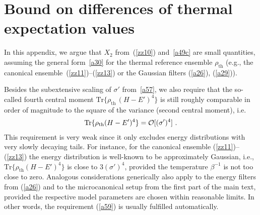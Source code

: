 \documentclass[twocolumn,aps,prb,floatfix,superscriptaddress]{revtex4-2}
\newcommand{\<}{\left\langle}	%
\renewcommand{\>}{\right\rangle}	%
\newcommand{\Pc}{\rho_{\mathrm{th}}}
\newcommand{\tr}{\mbox{Tr}}
\newcommand{\ord}{{\cal O}}
\newcommand{\rhoth}{\rho_{\mathrm{th}}}
\newcommand{\mref}[1]{\ref{#1}}
\begin{document}
\section{Bound on differences of thermal expectation values}
\label{app:C}

In this appendix,
we argue that $X_2$ from~(\mref{zz10}) and~\eqref{a49c} are small quantities,
assuming the general form~\eqref{a30} for the thermal reference ensemble $\rhoth$
(e.g., the canonical ensemble~(\mref{zz11})--(\mref{zz13}) or the Gaussian filters (\ref{a26}), (\ref{a29})).

Besides the subextensive scaling of $\sigma'$ from~\eqref{a57},
we also require
that the so-called fourth 
central moment $ \tr\{\Pc\, (H-E')^4\}$ is still roughly 
comparable in order of magnitude to the square of the
variance (second central moment), i.e.
\begin{eqnarray}
\tr\{\Pc (H-E')^4\} = \ord[ (\sigma')^4 ]
\ .
\label{a59}
\end{eqnarray}
This requirement is very weak since it only excludes
energy distributions with very slowly decaying tails.
For instance, for the canonical ensemble (\mref{zz11})--(\mref{zz13})
the energy distribution is well-known to be 
approximately Gaussian, 
i.e., $ \tr\{\Pc(H-E')^4\}$
is close to $3(\sigma')^4$, provided the
temperature $\beta^{-1}$ is not too close to zero.
Analogous considerations generically
also apply to the energy filters from (\ref{a26}) 
and to the microcanonical setup from 
the first part of the main text, provided the respective model 
parameters are chosen within reasonable limits.
In other words, the requirement (\ref{a59})
is usually fulfilled automatically.
\end{document}
